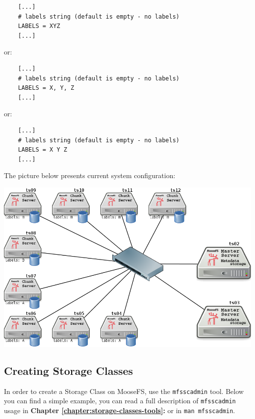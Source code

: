 \documentclass[a4paper,11pt,english]{report}
\def\code#1{\texttt{#1}}
\begin{document}
			\bigskip
			
			\begin{lstlisting}
	[...]
	# labels string (default is empty - no labels)
	LABELS = XYZ
	[...]
			\end{lstlisting}
			
			or:
			
			\begin{lstlisting}
	[...]
	# labels string (default is empty - no labels)
	LABELS = X, Y, Z
	[...]
			\end{lstlisting}
			
			or:
			
			\begin{lstlisting}
	[...]
	# labels string (default is empty - no labels)
	LABELS = X Y Z
	[...]
			\end{lstlisting}
			
			\bigskip
			
			The picture below presents current system configuration:			
			\bigskip
	
			\includegraphics[scale=0.5]{images/diagram_with_labels.png}
	
			\pagebreak
			
			\subsection{Creating Storage Classes}
			
			In order to create a Storage Class on MooseFS, use the \code{mfsscadmin} tool. Below you can find a simple example, you can read a full description of \code{mfsscadmin} usage in \textbf{Chapter \ref{chapter:storage-classes-tools}:  } or in \code{man mfsscadmin}.
			
\end{document}

